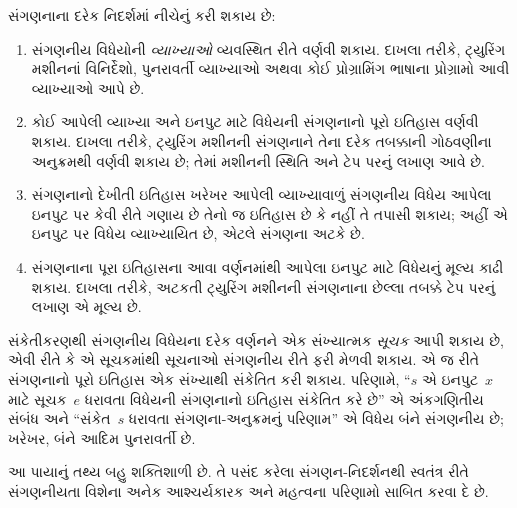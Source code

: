 \documentclass[../../../include/open-logic-section]{subfiles}
\begin{document}

સંગણનાના દરેક નિદર્શમાં નીચેનું કરી શકાય છે:
\begin{enumerate}
\item સંગણનીય વિધેયોની \emph{વ્યાખ્યાઓ} વ્યવસ્થિત રીતે વર્ણવી શકાય.
  દાખલા તરીકે, ટ્યુરિંગ મશીનનાં વિનિર્દેશો, પુનરાવર્તી વ્યાખ્યાઓ
  અથવા કોઈ પ્રોગ્રામિંગ ભાષાના પ્રોગ્રામો આવી વ્યાખ્યાઓ આપે છે.
\item કોઈ આપેલી વ્યાખ્યા અને ઇનપુટ માટે વિધેયની સંગણનાનો પૂરો
  ઇતિહાસ વર્ણવી શકાય. દાખલા તરીકે, ટ્યુરિંગ મશીનની સંગણનાને
  તેના દરેક તબક્કાની ગોઠવણીના અનુક્રમથી વર્ણવી શકાય છે; તેમાં
  મશીનની સ્થિતિ અને ટેપ પરનું લખાણ આવે છે.
\item સંગણનાનો દેખીતી ઇતિહાસ ખરેખર આપેલી વ્યાખ્યાવાળું સંગણનીય
  વિધેય આપેલા ઇનપુટ પર કેવી રીતે ગણાય છે તેનો જ ઇતિહાસ છે કે
  નહીં તે તપાસી શકાય; અહીં એ ઇનપુટ પર વિધેય વ્યાખ્યાયિત છે,
  એટલે સંગણના અટકે છે.
\item સંગણનાના પૂરા ઇતિહાસના આવા વર્ણનમાંથી આપેલા ઇનપુટ માટે
  વિધેયનું મૂલ્ય કાઢી શકાય. દાખલા તરીકે, અટકતી ટ્યુરિંગ મશીનની
  સંગણનાના છેલ્લા તબક્કે ટેપ પરનું લખાણ એ મૂલ્ય છે.
\end{enumerate}

સંકેતીકરણથી સંગણનીય વિધેયના દરેક વર્ણનને એક સંખ્યાત્મક
\emph{સૂચક} આપી શકાય છે, એવી રીતે કે એ સૂચકમાંથી સૂચનાઓ
સંગણનીય રીતે ફરી મેળવી શકાય. એ જ રીતે સંગણનાનો પૂરો ઇતિહાસ
એક સંખ્યાથી સંકેતિત કરી શકાય. પરિણામે, ``$s$ એ ઇનપુટ~$x$
માટે સૂચક~$e$ ધરાવતા વિધેયની સંગણનાનો ઇતિહાસ સંકેતિત કરે છે''
એ અંકગણિતીય સંબંધ અને ``સંકેત~$s$ ધરાવતા સંગણના-અનુક્રમનું
પરિણામ'' એ વિધેય બંને સંગણનીય છે; ખરેખર, બંને આદિમ પુનરાવર્તી છે.

આ પાયાનું તથ્ય બહુ શક્તિશાળી છે. તે પસંદ કરેલા સંગણન-નિદર્શનથી
સ્વતંત્ર રીતે સંગણનીયતા વિશેના અનેક આશ્ચર્યકારક અને મહત્વના
પરિણામો સાબિત કરવા દે છે.
\end{document}
